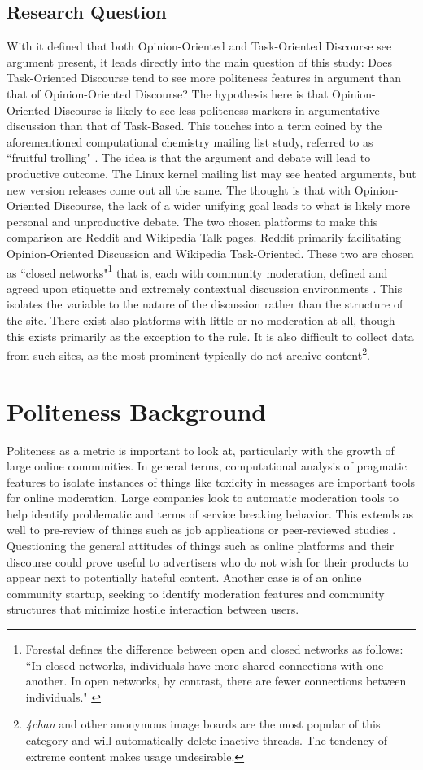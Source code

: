 \documentclass{article}
\begin{document}
\subsection{Research Question}
With it defined that both Opinion-Oriented and Task-Oriented Discourse see argument present, it leads directly into the main question of this study: Does Task-Oriented Discourse tend to see more politeness features in argument than that of Opinion-Oriented Discourse? The hypothesis here is that Opinion-Oriented Discourse is likely to see less politeness markers in argumentative discussion than that of Task-Based. This touches into a term coined by the aforementioned computational chemistry mailing list study, referred to as ``fruitful trolling" \cite[p. 53]{MLA}. The idea is that the argument and debate will lead to productive outcome. The Linux kernel mailing list may see heated arguments, but new version releases come out all the same. The thought is that with Opinion-Oriented Discourse, the lack of a wider unifying goal leads to what is likely more personal and unproductive debate. The two chosen platforms to make this comparison are Reddit and Wikipedia Talk pages. Reddit primarily facilitating Opinion-Oriented Discussion and Wikipedia Task-Oriented. These two are chosen as ``closed networks"\footnote{Forestal defines the difference between open and closed networks as follows: ``In closed networks, individuals have more shared connections with one another. In open networks, by contrast, there are fewer connections between individuals." \cite{PPS}} that is, each with community moderation, defined and agreed upon etiquette and extremely contextual discussion environments \cite{PPS}. This isolates the variable to the nature of the discussion rather than the structure of the site. There exist also platforms with little or no moderation at all, though this exists primarily as the exception to the rule. It is also difficult to collect data from such sites, as the most prominent typically do not archive content\footnote{\textit{4chan} and other anonymous image boards are the most popular of this category and will automatically delete inactive threads. The tendency of extreme content makes usage undesirable.}.

\section{Politeness Background}
Politeness as a metric is important to look at, particularly with the growth of large online communities. In general terms, computational analysis of pragmatic features to isolate instances of things like toxicity in messages are important tools for online moderation. Large companies look to automatic moderation tools to help identify problematic and terms of service breaking behavior. This extends as well to pre-review of things such as job applications or peer-reviewed studies \cite{UPS}. Questioning the general attitudes of things such as online platforms and their discourse could prove useful to advertisers who do not wish for their products to appear next to potentially hateful content. Another case is of an online community startup, seeking to identify moderation features and community structures that minimize hostile interaction between users.
\end{document}
